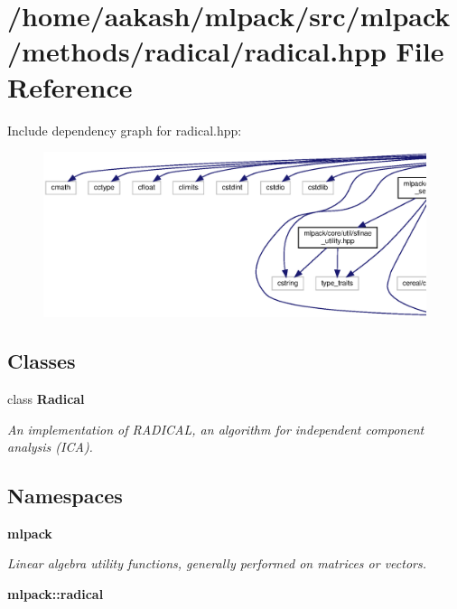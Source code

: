 \section{/home/aakash/mlpack/src/mlpack/methods/radical/radical.hpp File Reference}
\label{radical_8hpp}
Include dependency graph for radical.\+hpp\+:
\nopagebreak
\begin{figure}[H]
\begin{center}
\leavevmode
\includegraphics[width=350pt]{radical_8hpp__incl}
\end{center}
\end{figure}
\subsection*{Classes}
\begin{DoxyCompactItemize}
\item 
class \textbf{ Radical}
\begin{DoxyCompactList}\small\item\em An implementation of R\+A\+D\+I\+C\+AL, an algorithm for independent component analysis (I\+CA). \end{DoxyCompactList}\end{DoxyCompactItemize}
\subsection*{Namespaces}
\begin{DoxyCompactItemize}
\item 
 \textbf{ mlpack}
\begin{DoxyCompactList}\small\item\em Linear algebra utility functions, generally performed on matrices or vectors. \end{DoxyCompactList}\item 
 \textbf{ mlpack\+::radical}
\end{DoxyCompactItemize}
